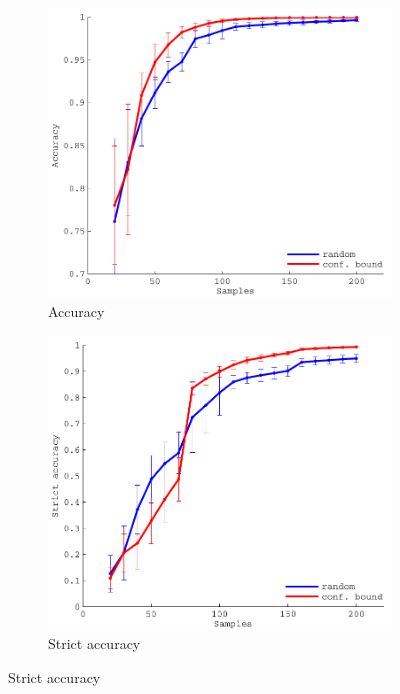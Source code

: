 \documentclass[11pt]{article} %
\begin{document}
\begin{figure}[tb]
  \begin{subfigure}[b]{0.329\textwidth}
    \centering
    \includegraphics[width=\textwidth]{figures/sin2d_eps_acc}
    \caption{Accuracy}
  \end{subfigure}
  \hfill
  \begin{subfigure}[b]{0.329\textwidth}
    \centering
    \includegraphics[width=\textwidth]{figures/sin2d_eps_strict_acc}
    \caption{Strict accuracy}
  \end{subfigure}

\end{figure}
\end{document}
